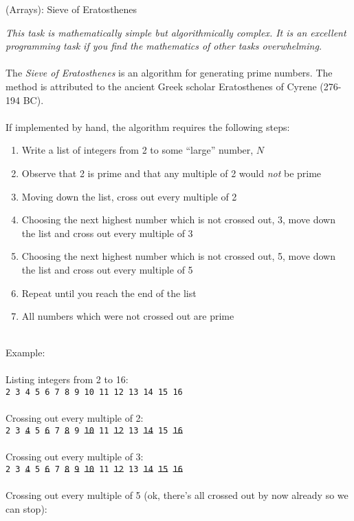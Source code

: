 \documentclass{lab}
\begin{document}
\pagebreak
\begin{task}{(Arrays): Sieve of Eratosthenes}{}

\textit{This task is mathematically simple but algorithmically complex. It is an excellent programming task if you find the mathematics of other tasks overwhelming.}
\\~\\
The \textit{Sieve of Eratosthenes} is an algorithm for generating prime numbers. The method is attributed to the ancient Greek scholar Eratosthenes of Cyrene (276-194 BC).
\\~\\
If implemented by hand, the algorithm requires the following steps:

\begin{enumerate}
\item Write a list of integers from 2 to some ``large'' number, $N$
\item Observe that 2 is prime and that any multiple of 2 would \textit{not} be prime
\item Moving down the list, cross out every multiple of 2
\item Choosing the next highest number which is not crossed out, 3, move down the list and cross out every multiple of 3
\item Choosing the next highest number which is not crossed out, 5, move down the list and cross out every multiple of 5
\item Repeat until you reach the end of the list
\item All numbers which were not crossed out are prime
\end{enumerate}
~\\
Example:
\\~\\
Listing integers from 2 to 16:\\
\texttt{2 3 4 5 6 7 8 9 10 11 12 13 14 15 16}
\\~\\
Crossing out every multiple of 2:\\
\texttt{2 3 \st{4} 5 \st{6} 7 \st{8} 9 \st{10} 11 \st{12} 13 \st{14} 15 \st{16}}
\\~\\
Crossing out every multiple of 3:\\
\texttt{2 3 \st{4} 5 \st{6} 7 \st{8} \st{9} \st{10} 11 \st{12} 13 \st{14} \st{15} \st{16}}
\\~\\
Crossing out every multiple of 5 (ok, there's all crossed out by now already so we can stop):\\

\end{task}
\end{document}
